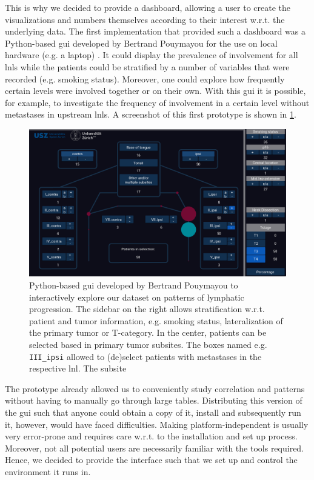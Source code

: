 \documentclass[\relativeRoot/main.tex]{subfiles}
\begin{document}
This is why we decided to provide a dashboard, allowing a user to create the visualizations and numbers themselves according to their interest w.r.t. the underlying data. The first implementation that provided such a dashboard was a Python-based \gls{gui} developed by Bertrand Pouymayou for the use on local hardware (e.g. a laptop) \cite{pouymayou_analysis_2019}. It could display the prevalence of involvement for all \glspl{lnl} while the patients could be stratified by a number of variables that were recorded (e.g. smoking status). Moreover, one could explore how frequently certain levels were involved together or on their own. With this \gls{gui} it is possible, for example, to investigate the frequency of involvement in a certain level without metastases in upstream \glspl{lnl}. A screenshot of this first prototype is shown in \cref{fig:lyprox:pouymayou_gui}.

\begin{figure}
    \centering
    \includegraphics[width=1.0\textwidth]{figures/pouymayou_gui.png}
    \caption[
        Prototype of a GUI to explore patterns of lymphatic progression
    ]{
        Python-based \gls{gui} developed by Bertrand Pouymayou to interactively explore our dataset on patterns of lymphatic progression. The sidebar on the right allows stratification w.r.t. patient and tumor information, e.g. smoking status, lateralization of the primary tumor or T-category. In the center, patients can be selected based in primary tumor subsites. The boxes named e.g. \texttt{III\_ipsi} allowed to (de)select patients with metastases in the respective \gls{lnl}. The subsite
    }
    \label{fig:lyprox:pouymayou_gui}
\end{figure}

The prototype already allowed us to conveniently study correlation and patterns without having to manually go through large tables. Distributing this version of the \gls{gui} such that anyone could obtain a copy of it, install and subsequently run it, however, would have faced difficulties. Making  platform-independent is usually very error-prone and requires care w.r.t. to the installation and set up process. Moreover, not all potential users are necessarily familiar with the tools required. Hence, we decided to provide the interface such that we set up and control the environment it runs in.
\end{document}
